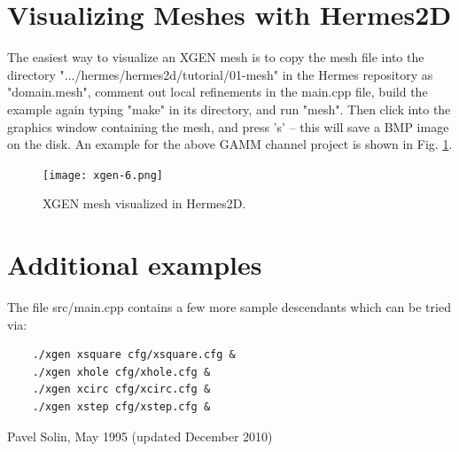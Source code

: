 \documentclass[12pt]{article}
\begin{document}
  \section{Visualizing Meshes with Hermes2D}

  The easiest way to visualize an XGEN mesh is to copy the mesh file into 
  the directory ".../hermes/hermes2d/tutorial/01-mesh" in the Hermes repository
  as "domain.mesh", comment out local refinements
  in the main.cpp file, build the example again typing "make" in its directory, and 
  run "mesh". Then click into the graphics window containing the mesh, and press 's'
  -- this will save a BMP image on the disk. An example for the above GAMM channel
  project is shown in Fig. \ref{fig:hermes}.

  \begin{figure}[!ht]
  \begin{center}
  \texttt{[image: xgen-6.png]}
  \end{center}
  \vspace{-6mm}
  \caption{XGEN mesh visualized in Hermes2D.}
  \label{fig:hermes}
  \end{figure}

  \section{Additional examples}

  The file src/main.cpp contains a few more sample descendants which 
  can be tried via:

  \begin{verbatim}
    ./xgen xsquare cfg/xsquare.cfg &
    ./xgen xhole cfg/xhole.cfg &
    ./xgen xcirc cfg/xcirc.cfg &
    ./xgen xstep cfg/xstep.cfg &
  \end{verbatim}


  \hbox{} \hfill Pavel Solin, May 1995 (updated December 2010)
\end{document}

